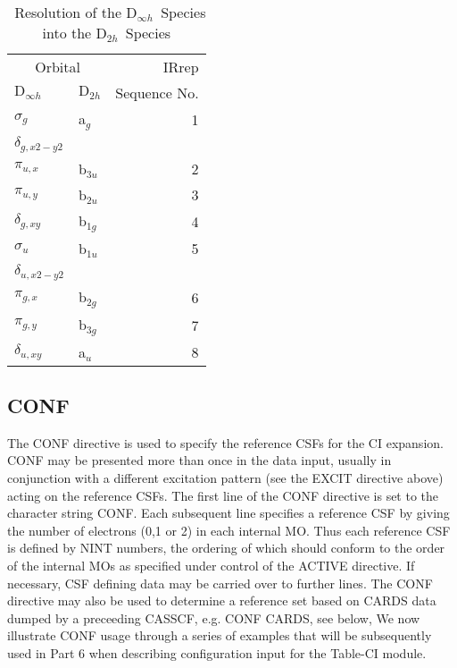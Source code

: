 \documentclass[11pt,fleqn]{article}
\newcommand{\dinfh}{\mbox{D$_{\infty h}$}}
\newcommand{\dtwoh}{\mbox{D$_{2h}$}}
\begin{document}
\begin{table}
 \caption{\label{table:2}\ Resolution of the \dinfh\ Species into the \dtwoh\ Species}

 \begin{centering}
 \begin{tabular}{llr}
 \\ \hline\hline
\multicolumn{2}{c}{Orbital} &  IRrep  \\
         \cline{1-2}
    $\dinfh$ & $\dtwoh$ & Sequence No. \\ \cline{1-3}

 $\sigma_{g}$            &   a$_{g}$         &    1 \\
 $\delta_{g,x2-y2}$ &                   &      \\
 $\pi_{u,x}$        &   b$_{3u}$         &    2 \\
 $\pi_{u,y}$        &   b$_{2u}$         &    3 \\
 $\delta_{g,xy}$    &   b$_{1g}$         &    4 \\
 $\sigma_{u}$      &   b$_{1u}$         &    5 \\
 $\delta_{u,x2-y2}$ &                   &      \\
 $\pi_{g,x}$        &   b$_{2g}$         &    6 \\
 $\pi_{g,y}$        &   b$_{3g}$         &    7 \\
 $\delta_{u,xy}$    &   a$_{u}$         &     8 \\  \hline\hline
\end{tabular}

\end{centering}
\end{table}


\subsection[CONF]{CONF}

 The CONF directive is used to specify the reference CSFs for
the CI expansion. CONF may be presented more than once in the data
input, usually in conjunction with a different excitation pattern 
(see the
EXCIT directive above) acting on the reference CSFs. The first
line of the CONF directive is set to the character string CONF. 
Each subsequent
line specifies a reference CSF by giving the number of electrons
(0,1 or 2) in each internal MO. Thus each reference CSF is
defined by NINT numbers, the ordering of which should conform to the
order of the internal MOs as specified under control of the ACTIVE
directive.  If necessary, CSF defining
data may be carried over to further lines. 
The CONF directive may also be used to determine a reference set based
on CARDS data dumped by a preceeding CASSCF, e.g.  CONF CARDS, see below,
We now illustrate CONF usage through a series of examples that will
be subsequently used in Part 6 when describing configuration
input for the Table-CI module.\\
\end{document}
